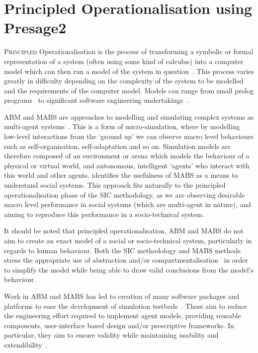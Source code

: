 \chapter{Principled Operationalisation using Presage2}

\lettrine[lines=3]{P}{rincipled} Operationalisation is the process of transforming a symbolic or formal representation of a system (often using some kind of calculus) into a computer model which can then run a model of the system in question~\citep{Jones2013}. This process varies greatly in difficulty depending on the complexity of the system to be modelled and the requirements of the computer model. Models can range from small prolog programs~\citep{Pitt2005a} to significant software engineering undertakings~\citep{Timm,Oguara2005}.

\ac{ABM} and \ac{MABS} are approaches to modelling and simulating complex systems as multi-agent systems~\citep{Macal2010,Moss2001}.
This is a form of micro-simulation, where by modelling low-level interactions from the `ground up' we can observe macro level behaviours such as self-organisation, self-adaptation and so on.
Simulation models are therefore composed of an environment or arena which models the behaviour of a physical or virtual world, and autonomous, intelligent `agents' who interact with this world and other agents. 
\citet{Axelrod1997} identifies the usefulness of \ac{MABS} as a means to understand social systems. 
This approach fits naturally to the principled operationalisation phase of the \ac{SIC} methodology, as we are observing desirable macro level performance in social systems (which are multi-agent in nature), and aiming to reproduce this performance in a socio-technical system. 

It should be noted that principled operationalisation, \ac{ABM} and \ac{MABS} do not aim to create an exact model of a social or socio-technical system, particularly in regards to human behaviour. Both the \ac{SIC} methodology and \ac{MABS} methods stress the appropriate use of abstraction and/or compartmentalisation~\citep{Edmonds2001} in order to simplify the model while being able to draw valid conclusions from the model's behaviour.

Work in \ac{ABM} and \ac{MABS} has led to creation of many software packages and platforms to ease the development of simulation testbeds~\citep{CynthiaNikolaiandGregoryMadey2009}. These aim to reduce the engineering effort required to implement agent models, providing reusable components, user-interface based design and/or prescriptive frameworks. In particular, they aim to ensure validity while maintaining usability and extendibility~\citep{Axelrod1997}.

